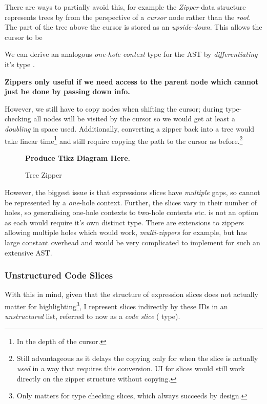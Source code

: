 There are ways to partially avoid this, for example the \textit{Zipper} data structure represents trees by from the perspective of a \textit{cursor} node rather than the \textit{root}. The part of the tree above the cursor is stored as an \textit{upside-down}. This allows the cursor to be 

We can derive an analogous \textit{one-hole context} type for the AST by \textit{differentiating} it's type \cite{OneHoleContext, TypeDerivatives}. 


\textbf{Zippers only useful if we need access to the parent node which cannot just be done by passing down info.}

However, we still have to copy nodes when shifting the cursor; during type-checking all nodes will be visited by the cursor so we would get at least a \textit{doubling} in space used. Additionally, converting a zipper back into a tree would take linear time\footnote{In the depth of the cursor.} and still require copying the path to the cursor as before.\footnote{Still advantageous as it delays the copying only for when the slice is actually \textit{used} in a way that requires this conversion. UI for slices would still work directly on the zipper structure without copying.} 

\begin{figure}[h]
\textbf{Produce Tikz Diagram Here.}
\caption{Tree Zipper}
\label{fig:PersistentZipper}
\end{figure}

However, the biggest issue is that expressions slices have \textit{multiple} gaps, so cannot be represented by a \textit{one}-hole context. Further, the slices vary in their number of holes, so generalising one-hole contexts to two-hole contexts etc. is not an option as each would require it's own distinct type. There are extensions to zippers allowing multiple holes which would work, \textit{multi-zippers} \cite{MultiZipper} for example, but has large constant overhead and would be very complicated to implement for such an extensive AST.

\subsubsection{Unstructured Code Slices}
With this in mind, given that the structure of expression slices does not actually matter for highlighting\footnote{Only matters for type checking slices, which always succeeds by design.}, I represent slices indirectly by these IDs in an \textit{unstructured} list, referred to now as a \textit{code slice} ( type).

